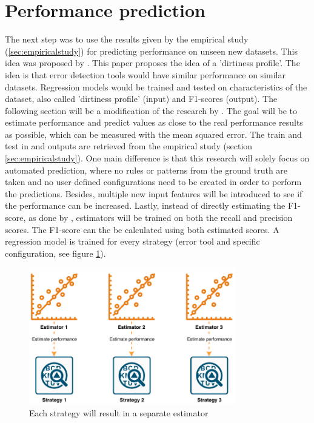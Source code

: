 \section{Performance prediction}
\label{sec:performanceprediction}
The next step was to use the results given by the empirical study (\ref{sec:empiricalstudy}) for predicting performance on unseen new datasets. This idea was proposed by \cite{Mahdavi2019-pk}. This paper proposes the idea of a 'dirtiness profile'. The idea is that error detection tools would have similar performance on similar datasets. Regression models would be trained and tested on characteristics of the dataset, also called 'dirtiness profile' (input) and F1-scores (output). The following section will be a modification of the research by \cite{Mahdavi2019-pk}. 
The goal will be to estimate performance and predict values as close to the real performance results as possible, which can be measured with the mean squared error.
The train and test in and outputs are retrieved from the empirical study (section \ref{sec:empiricalstudy}). One main difference is that this research will solely focus on automated prediction, where no rules or patterns from the ground truth are taken and no user defined configurations need to be created in order to perform the predictions. Besides, multiple new input features will be introduced to see if the performance can be increased. Lastly, instead of directly estimating the F1-score, as done by \cite{Mahdavi2019-pk}, estimators will be trained on both the recall and precision scores. The F1-score can the be calculated using both estimated scores.
A regression model is trained for every strategy (error tool and specific configuration, see figure \ref{fig:eachstrategy}). 

\begin{figure}
	\centering
	\includegraphics[width=0.8\textwidth]{thesis/Figures/Method/PerformanceEstimation-OnlyEstimate.pdf}
	\caption{Each strategy will result in a separate estimator}
	\label{fig:eachstrategy}
\end{figure}

